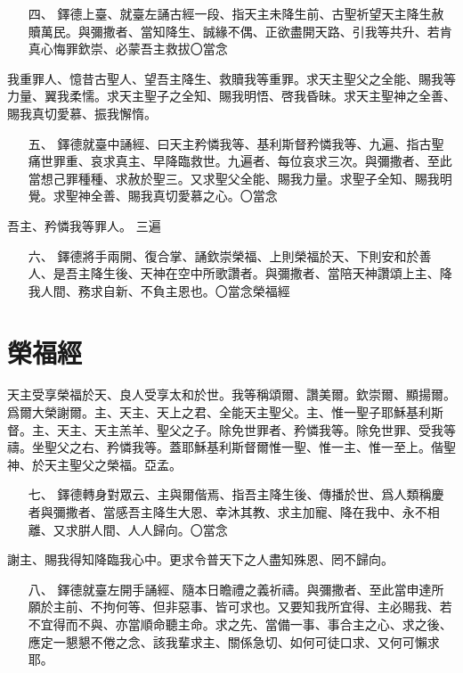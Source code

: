 \begin{enumerate}
    \item[四、]{\small 鐸德上臺、就臺左誦古經一段、指天主未降生前、古聖祈望天主降生赦贖萬民。與彌撒者、當知降生、誠緣不偶、正欲盡開天路、引我等共升、若肯真心悔罪欽崇、必蒙吾主救拔〇當念}
\end{enumerate}
我重罪人、憶昔古聖人、望吾主降生、救贖我等重罪。求天主聖父之全能、賜我等力量、翼我柔懦。求天主聖子之全知、賜我明悟、啓我昏昧。求天主聖神之全善、賜我真切愛慕、振我懈惰。

\begin{enumerate}
    \item[五、]{\small 鐸德就臺中誦經、曰天主矜憐我等、基利斯督矜憐我等、九遍、指古聖痛世罪重、哀求真主、早降臨救世。九遍者、每位哀求三次。與彌撒者、至此當想己罪種種、求赦於聖三。又求聖父全能、賜我力量。求聖子全知、賜我明覺。求聖神全善、賜我真切愛慕之心。〇當念}
\end{enumerate}
吾主、矜憐我等罪人。 {\small 三遍}

\begin{enumerate}
    \item[六、]{\small 鐸德將手兩開、復合掌、誦欽崇榮福、上則榮福於天、下則安和於善人、是吾主降生後、天神在空中所歌讚者。與彌撒者、當陪天神讚頌上主、降我人間、務求自新、不負主恩也。〇當念榮福經}
\end{enumerate}

\section*{榮福經}
天主受享榮福於天、良人受享太和於世。我等稱頌爾、讚美爾。欽崇爾、顯揚爾。爲爾大榮謝爾。主、天主、天上之君、全能天主聖父。主、惟一聖子耶穌基利斯督。主、天主、天主羔羊、聖父之子。除免世罪者、矜憐我等。除免世罪、受我等禱。坐聖父之右、矜憐我等。蓋耶穌基利斯督爾惟一聖、惟一主、惟一至上。偕聖神、於天主聖父之榮福。{\cspace}亞孟。

\begin{enumerate}
    \item[七、]{\small 鐸德轉身對眾云、主與爾偕焉、指吾主降生後、傳播於世、爲人類稱慶者與彌撒者、當感吾主降生大恩、幸沐其教、求主加寵、降在我中、永不相離、又求腁人間、人人歸向。〇當念}
\end{enumerate}
謝主、賜我得知降臨我心中。更求令普天下之人盡知殊恩、罔不歸向。

\begin{enumerate}
    \item[八、]{\small 鐸德就臺左開手誦經、隨本日瞻禮之義祈禱。與彌撒者、至此當申達所願於主前、不拘何等、但非惡事、皆可求也。又要知我所宜得、主必賜我、若不宜得而不與、亦當順命聽主命。求之先、當備一事、事合主之心、求之後、應定一懇懇不倦之念、該我輩求主、關係急切、如何可徒口求、又何可懶求耶。}
\end{enumerate}
